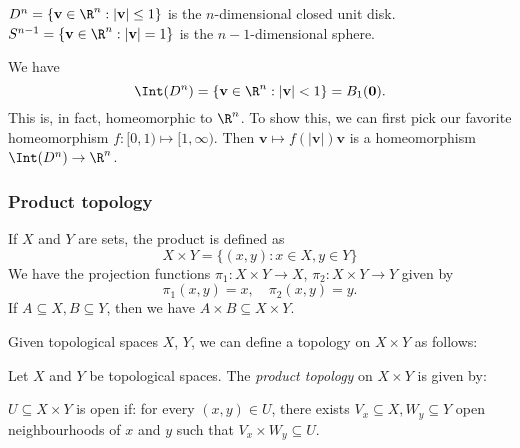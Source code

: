 \documentclass[a4paper]{article}
\begin{document}
\begin{eg}
  $D^n = \{\mathbf{v}\in \R^n: |\mathbf{v}|\leq 1\}$ is the $n$-dimensional closed unit disk. $S^{n - 1} = \{\mathbf{v}\in \R^n: |\mathbf{v}| = 1\}$ is the $n - 1$-dimensional sphere.

  We have
  \[
    \Int(D^n) = \{\mathbf{v}\in \R^n : |\mathbf{v}| < 1\} = B_1(\mathbf{0}).
  \]
  This is, in fact, homeomorphic to $\R^n$. To show this, we can first pick our favorite homeomorphism $f: [0, 1) \mapsto [1, \infty)$. Then $\mathbf{v}\mapsto f(|\mathbf{v}|)\mathbf{v}$ is a homeomorphism $\Int(D^n) \to \R^n$.
\end{eg}
\subsubsection{Product topology}
If $X$ and $Y$ are sets, the product is defined as
\[
  X\times Y = \{(x, y): x\in X, y\in Y\}
\]
We have the projection functions $\pi_1: X\times Y \to X$, $\pi_2: X\times Y \to Y$ given by
\[
  \pi_1(x, y) = x,\quad \pi_2(x, y) = y.
\]
If $A\subseteq X, B\subseteq Y$, then we have $A\times B \subseteq X\times Y$.

Given topological spaces $X$, $Y$, we can define a topology on $X\times Y$ as follows:
\begin{defi}
  Let $X$ and $Y$ be topological spaces. The \emph{product topology} on $X\times Y$ is given by:

  $U\subseteq X\times Y$ is open if: for every $(x, y)\in U$, there exists $V_x\subseteq X, W_y\subseteq Y$ open neighbourhoods of $x$ and $y$ such that $V_x\times W_y \subseteq U$.
\end{defi}
\end{document}
